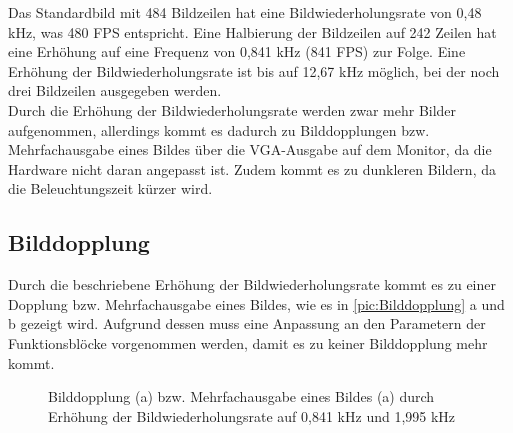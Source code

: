 \documentclass[ngerman,12pt]{article} %
\begin{document}
{Das Standardbild mit 484 Bildzeilen hat eine Bildwiederholungsrate von 0,48 kHz, was 480 FPS entspricht. Eine Halbierung der Bildzeilen auf 242 Zeilen hat eine Erhöhung auf eine Frequenz von 0,841 kHz (841 FPS) zur Folge. Eine Erhöhung der Bildwiederholungsrate ist bis auf 12,67 kHz möglich, bei der noch drei Bildzeilen ausgegeben werden.\\
Durch die Erhöhung der Bildwiederholungsrate werden zwar mehr Bilder aufgenommen, allerdings kommt es dadurch zu Bilddopplungen bzw. Mehrfachausgabe eines Bildes über die VGA-Ausgabe auf dem Monitor, da die Hardware nicht daran angepasst ist. Zudem kommt es zu dunkleren Bildern, da die Beleuchtungszeit kürzer wird.



\subsection{Bilddopplung}
\label{sec:Bilddopplung}
Durch die beschriebene Erhöhung der Bildwiederholungsrate kommt es zu einer Dopplung bzw. Mehrfachausgabe eines Bildes, wie es in \autoref{pic:Bilddopplung} a und b gezeigt wird. Aufgrund dessen muss eine Anpassung an den Parametern der Funktionsblöcke vorgenommen werden, damit es zu keiner Bilddopplung mehr kommt.\newline

\begin{figure}
  \centering
  \qquad
  \caption[Bilddopplung bzw. Mehrfachausgabe eines Bildes durch Erhöhung der Bildwiederholungsrate]{\label{pic:Bilddopplung}Bilddopplung (a) bzw. Mehrfachausgabe eines Bildes (a) durch Erhöhung der Bildwiederholungsrate auf 0,841 kHz und 1,995 kHz}
\end{figure}

}
\end{document}
